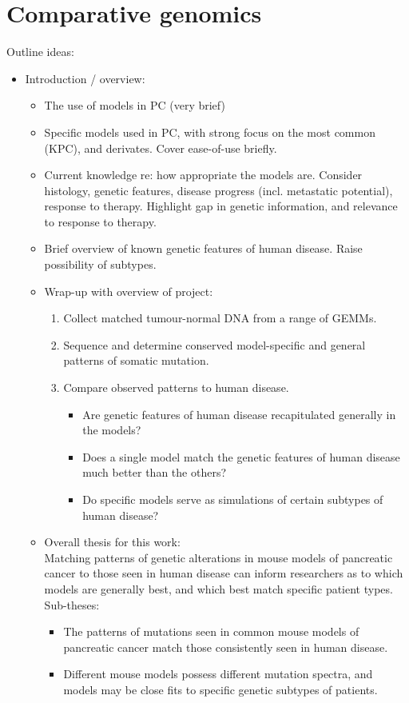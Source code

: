 \documentclass[dissertation.tex]{subfiles}
\begin{document}
\chapter{Comparative genomics}
\label{chap:comparative}

Outline ideas:
\begin{itemize}
  \item Introduction / overview:
  \begin{itemize}
    \item The use of models in PC (very brief)
    \item Specific models used in PC, with strong focus on the most common (KPC), and derivates.  Cover ease-of-use briefly.
    \item Current knowledge re: how appropriate the models are.  Consider histology, genetic features, disease progress (incl. metastatic potential), response to therapy.  Highlight gap in genetic information, and relevance to response to therapy.
    \item Brief overview of known genetic features of human disease.  Raise possibility of subtypes.
    \item Wrap-up with overview of project:
    \begin{enumerate}
      \item Collect matched tumour-normal DNA from a range of GEMMs.
      \item Sequence and determine conserved model-specific and general patterns of somatic mutation.
      \item Compare observed patterns to human disease.
      \begin{itemize}
        \item Are genetic features of human disease recapitulated generally in the models?
        \item Does a single model match the genetic features of human disease much better than the others?
        \item Do specific models serve as simulations of certain subtypes of human disease?
      \end{itemize}
    \end{enumerate}
    \item Overall thesis for this work: \\
    Matching patterns of genetic alterations in mouse models of pancreatic cancer to those seen in human disease can inform researchers as to which models are generally best, and which best match specific patient types. \\
    Sub-theses:
    \begin{itemize}
      \item The patterns of mutations seen in common mouse models of pancreatic cancer match those consistently seen in human disease.
      \item Different mouse models possess different mutation spectra, and models may be close fits to specific genetic subtypes of patients.
    \end{itemize}
  \end{itemize}
  

\end{itemize}
\end{document}

